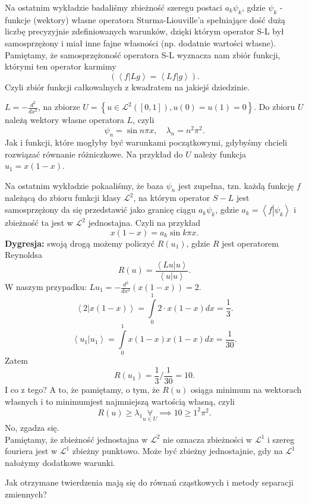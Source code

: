 \documentclass[../main.tex]{subfiles}
\begin{document}
Na ostatnim wykładzie badaliśmy zbieżność szeregu postaci $a_k \psi_k$, gdzie $\psi_k$ - funkcje (wektory) własne operatora Sturma-Liouville'a spełniające dość dużą liczbę precyzyjnie zdefiniowanych warunków, dzięki którym operator S-L był samosprzężony i miał inne fajne własności (np. dodatnie wartości własne). Pamiętamy, że samosprzężoność operatora S-L wyznacza nam zbiór funkcji, którymi ten operator karmimy
\[
		\left( \left<f \left| Lg\right. \right> = \left<Lf \left| g\right. \right>  \right)
.\]
Czyli zbiór funkcji całkowalnych z kwadratem na jakiejś dziedzinie.
\begin{przyklad}
		$L = -\frac{d^2}{dx^2}$, na zbiorze $U = \left\{ u\in \mathcal{L}^2([0,1]), u(0) = u(1) = 0 \right\} $. Do zbioru $U$ należą wektory własne operatora $L$, czyli
		\[
		\psi_n = \sin n\pi x,\quad \lambda_n = n^2\pi^2
		.\]
		Jak i funkcji, które mogłyby być warunkami początkowymi, gdybyśmy chcieli rozwiązać równanie różniczkowe. Na przykład do $U$ należy funkcja $u_1 = x(1-x)$.
\end{przyklad}
Na ostatnim wykładzie pokaaliśmy, że baza $\psi_n$ jest zupełna, tzn. każdą funkcję $f$ należącą do zbioru funkcji klasy $\mathcal{L}^2$, na którym operator $S-L$ jest samosprzężony da się przedstawić jako granicę ciągu $a_k\psi_k$, gdzie $a_k = \left<f \left| \psi_k\right. \right> $ i zbieżność ta jest w $\mathcal{L}^2$ jednostajna.
Czyli na przykład
\[
		x(1-x) = a_k \sin k\pi x
.\]
\textbf{Dygresja:} swoją drogą możemy policzyć $R(u_1)$, gdzie $R$ jest operatorem Reynoldsa
\[
		R(u) = \frac{\left<Lu \left| u\right. \right> }{\left<u \left| u\right. \right> }
.\]
W naszym przypadku: $Lu_1 = -\frac{d^2}{dx^2}\left( x\left( 1-x \right)  \right) = 2.$
\[
		\left<2 \left| x(1-x)\right. \right> = \int\limits_0^1 2\cdot x(1-x)dx = \frac{1}{3}
.\]
\[
		\left<u_1 \left| u_1\right. \right> = \int\limits_0^1 x(1-x)x(1-x)dx = \frac{1}{30}
.\]
Zatem
\[
		R(u_1) = \frac{1}{3} / \frac{1}{30} = 10
.\]
I co z tego? A to, że pamiętamy, o tym, że $R(u)$ osiąga minimum na wektorach własnych i to minimumjest najmniejszą wartością własną, czyli
\[
		R(u) \ge \lambda_1 \underset{u\in U}{\forall} \implies 10\ge 1^2 \pi^2
.\]
No, zgadza się.\\
Pamiętamy, że zbieżność jednostajna w $\mathcal{L}^2$ nie oznacza zbieżności w $\mathcal{L}^1$ i szereg fouriera jest w $\mathcal{L}^1$ zbieżny punktowo. Może być zbieżny jednostajnie, gdy na $\mathcal{L}^1$ nałożymy dodatkowe warunki.
\begin{pytanie}
		Jak otrzymane twierdzenia mają się do równań cząstkowych i metody separacji zmiennych?
\end{pytanie}
\end{document}
